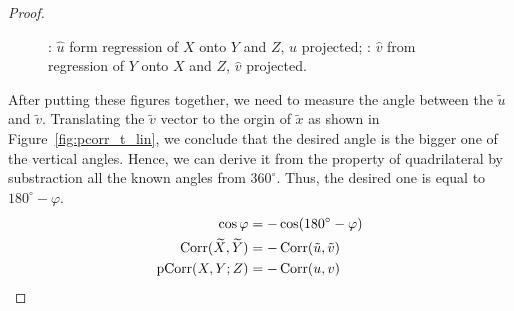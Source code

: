 \begin{proof}
\begin{figure}[ht!]
\begin{center}
\caption{: $\hat u$ form regression of $X$ onto $Y$ and $Z$, $\hat u$ projected;
: $\hat v$ from regression of $Y$ onto $X$ and $Z$, $\hat v$ projected.}
\end{center}
\end{figure}


After putting these figures together, we need to measure the angle
between the $\tilde u$ and $\tilde v$.
Translating the $\tilde v$ vector to the orgin of $\tilde x$ as shown in Figure~\ref{fig:pcorr_t_lin},
we conclude that the desired angle is the bigger one of the vertical angles.
Hence, we can derive it from the property of quadrilateral
by substraction all the known angles from $360^\circ$.
Thus, the desired one is equal to $180^\circ - \varphi$.
\begin{align*}
\cos\varphi &= - \cos(180^\circ - \varphi) \\
\operatorname{Corr}(\widetilde X, \widetilde Y) &= -\operatorname{Corr}(\tilde u, \tilde v) \\
\operatorname{pCorr}(X,Y; Z) &= -\operatorname{Corr}(u, v)
\end{align*}



\end{proof}
